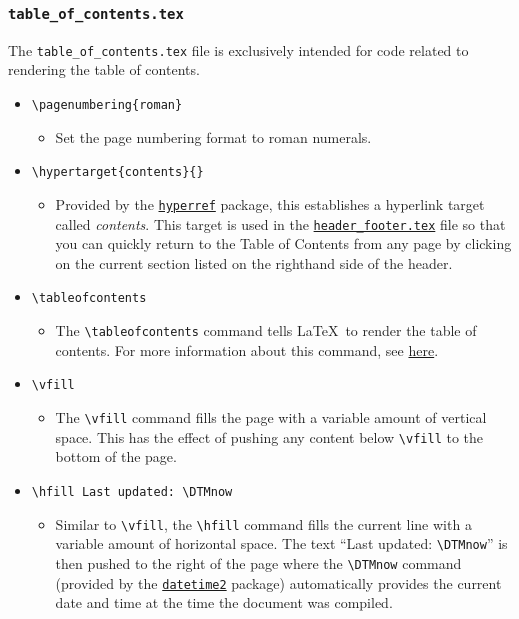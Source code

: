 \subsubsection{\texttt{table\_of\_contents.tex}}
\label{sec:table_of_contents.tex}


The \texttt{table\_of\_contents.tex} file is exclusively intended for code related to rendering the table of contents.
\begin{itemize}
    \item \lstinline|\pagenumbering{roman}|
    \begin{itemize}
        \item Set the page numbering format to roman numerals.
    \end{itemize}
    \item \lstinline|\hypertarget{contents}{}|
    \begin{itemize}
        \item Provided by the \href{https://ctan.org/pkg/hyperref}{\texttt{hyperref}} package, this establishes a hyperlink target called \textit{contents}. This target is used in the \hyperref[sec:header_footer.tex]{\texttt{header\_footer.tex}} file so that you can quickly return to the Table of Contents from any page by clicking on the current section listed on the righthand side of the header. 
    \end{itemize}
    \item \lstinline|\tableofcontents|
    \begin{itemize}
        \item The \lstinline|\tableofcontents| command tells \LaTeX\ to render the table of contents. For more information about this command, see \href{https://en.wikibooks.org/wiki/LaTeX/Document_Structure#Table_of_contents}{here}.
    \end{itemize}
    \item \lstinline|\vfill|
    \begin{itemize}
        \item The \lstinline|\vfill| command fills the page with a variable amount of vertical space. This has the effect of pushing any content below \lstinline|\vfill| to the bottom of the page.
    \end{itemize}
    \item \lstinline|\hfill Last updated: \DTMnow|
    \begin{itemize}
        \item Similar to \lstinline|\vfill|, the \lstinline|\hfill| command fills the current line with a variable amount of horizontal space. The text ``Last updated: \lstinline|\DTMnow|'' is then pushed to the right of the page where the \lstinline|\DTMnow| command (provided by the \href{https://ctan.org/pkg/datetime2}{\texttt{datetime2}} package) automatically provides the current date and time at the time the document was compiled.

\end{itemize}
\end{itemize}
